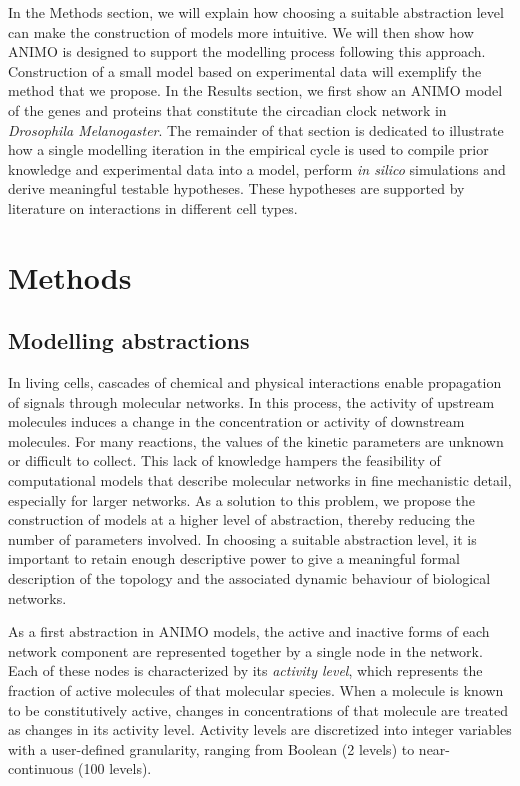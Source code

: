 \documentclass{bmcart}
\begin{document}
In the Methods section, we will explain how choosing a suitable abstraction level can make the construction
of models more intuitive. We will then show how ANIMO is designed to support the modelling process following
this approach. Construction of a small model based on experimental data will exemplify the method that we
propose. In the Results section, we first show an ANIMO model of the genes and proteins that constitute
the circadian clock network in \emph{Drosophila Melanogaster}. The remainder of that section is dedicated to
illustrate how a single modelling iteration in the empirical cycle is used to compile prior knowledge and
experimental data into a model, perform \emph{in silico} simulations and derive meaningful testable 
hypotheses. These hypotheses are supported by literature on interactions in different cell types.



\section*{Methods}
\subsection*{Modelling abstractions}\label{subsec:abstractions}

In living cells, cascades of chemical and physical interactions enable propagation of signals through molecular networks.
In this process, the activity of upstream molecules induces a change in the 
concentration or activity of downstream molecules. For many reactions, the values of the kinetic parameters 
are unknown or difficult to collect. This lack of knowledge hampers the feasibility 
of computational models that describe molecular networks in fine mechanistic detail, especially for larger networks.
As a solution to this problem, we propose the construction of models at a higher level of abstraction, 
thereby reducing the number of parameters involved. In choosing a suitable abstraction level, it is important to 
retain enough descriptive power to give a meaningful formal description of the topology and the 
associated dynamic behaviour of biological networks.

As a first abstraction in ANIMO models, the active and inactive forms of each network component 
are represented together by a single node in the network.
Each of these nodes is characterized by its \emph{activity level}, which
represents the fraction of active molecules of that molecular species. When a molecule is known to be 
constitutively active, changes in concentrations of that molecule are treated as changes in its activity level.
Activity levels are discretized into integer variables with a user-defined granularity, ranging from 
Boolean (2 levels) to near-continuous (100 levels).
\end{document}
